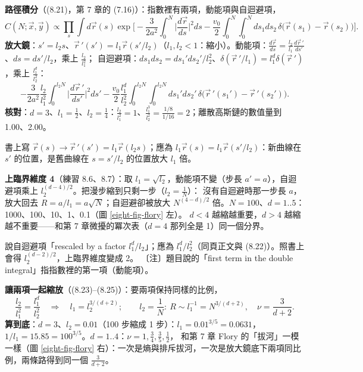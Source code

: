 \textbf{路徑積分}（(8.21)，第 7 章的 (7.16)）：指數裡有兩項，動能項與自迴避項，
\[C(N;\vec x,\vec y)\propto\prod_s\int d\vec r(s)\exp\Big[-\frac3{2a^2}\int_0^N\Big|\frac{d\vec r}{ds}\Big|^2ds-\frac{v_0}2\int_0^N\!\!\int_0^Nds_1ds_2\,\delta\big(\vec r(s_1)-\vec r(s_2)\big)\Big].\tag{8.21}\]
\textbf{放大鏡}：$s'=l_2s$、$\vec r\,'(s')=l_1\vec r(s'/l_2)$（$l_1,l_2<1$：縮小）。動能項：$\frac{d\vec r}{ds}=\frac{l_2}{l_1}\frac{d\vec r\,'}{ds'}$、$ds=ds'/l_2$，乘上 $\frac{l_2}{l_1^2}$；
自迴避項：$ds_1ds_2=ds_1'ds_2'/l_2^2$、$\delta(\vec r\,'/l_1)=l_1^d\delta(\vec r\,')$，乘上 $\frac{l_1^d}{l_2^2}$：
\[-\frac3{2a^2}\frac{l_2}{l_1^2}\int_0^{l_2N}\Big|\frac{d\vec r\,'}{ds'}\Big|^2ds'-\frac{v_0}2\frac{l_1^d}{l_2^2}\int_0^{l_2N}\!\!\int_0^{l_2N}ds_1'ds_2'\,\delta\big(\vec r\,'(s_1')-\vec r\,'(s_2')\big).\tag{8.22}\]
\textbf{核對}：$d=3$、$l_1=\frac12$、$l_2=\frac14$：$\frac{l_2}{l_1^2}=1$、$\frac{l_1^3}{l_2^2}=\frac{1/8}{1/16}=2$；離散高斯鏈的數值量到 1.00、2.00。
\begin{errbox}[p.~200，(8.22) 前]
書上寫 $\vec r(s)\to\vec r\,'(s')=l_1\vec r(l_2s)$；應為 $l_1\vec r(s)=l_1\vec r(s'/l_2)$：新曲線在 $s'$ 的位置，是舊曲線在 $s=s'/l_2$ 的位置放大 $l_1$ 倍。
\end{errbox}

\textbf{上臨界維度 4}（練習 8.6、8.7）：取 $l_1=\sqrt{l_2}$，動能項不變（步長 $a'=a$），自迴避項乘上 $l_2^{(d-4)/2}$。把漫步縮到只剩一步（$l_2=\frac1N$）：
沒有自迴避時那一步長 $a$，放大回去 $R=a/l_1=a\sqrt N$；自迴避卻被放大 $N^{(4-d)/2}$ 倍。$N=100$、$d=1..5$：1000、100、10、1、0.1（圖 \ref{eight-fig-flory} 左）。
$d<4$ 越縮越重要，$d>4$ 越縮越不重要——和第 7 章微擾的冪次表（$d=4$ 那列全是 1）同一個分界。
\begin{errbox}[p.~200，練習 8.6]
說自迴避項「rescaled by a factor $l_1^d/l_2$」；應為 $l_1^d/l_2^2$（同頁正文與 (8.22)）。照書上會得 $l_2^{(d-2)/2}$，上臨界維度變成 2。
〔注〕題目說的「first term in the double integral」指指數裡的第一項（動能項）。
\end{errbox}

\textbf{讓兩項一起縮放}（(8.23)--(8.25)）：要兩項保持同樣的比例，
\[\frac{l_2}{l_1^2}=\frac{l_1^d}{l_2^2}\quad\Rightarrow\quad l_1=l_2^{3/(d+2)};\qquad l_2=\frac1N:\ R\sim l_1^{-1}=N^{3/(d+2)},\quad\nu=\frac3{d+2}.\tag{8.24, 8.25}\]
\textbf{算到底}：$d=3$、$l_2=0.01$（100 步縮成 1 步）：$l_1=0.01^{3/5}=0.0631$，$1/l_1=15.85=100^{3/5}$。$d=1..4$：$\nu=1,\frac34,\frac35,\frac12$，
和第 7 章 Flory 的「拔河」一模一樣（圖 \ref{eight-fig-flory} 右）：一次是熵與排斥拔河，一次是放大鏡底下兩項同比例，兩條路得到同一個 $\frac3{d+2}$。

